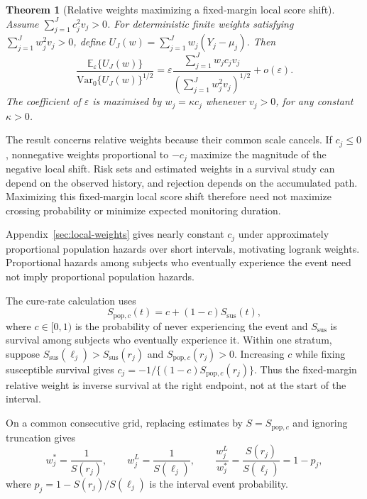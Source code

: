 \documentclass[12pt]{article}
\newtheorem{theorem}{Theorem}[section]
\theoremstyle{definition}
\theoremstyle{remark}
\begin{document}
\begin{theorem}[Relative weights maximizing a fixed-margin local score shift]
\label{thm:optimal-weight}
Assume $\sum_{j=1}^{J}c_j^2v_j>0$. For deterministic finite weights satisfying $\sum_{j=1}^Jw_j^2v_j>0$, define $U_J(w)=\sum_{j=1}^Jw_j(Y_j-\mu_j)$. Then
\begin{equation}
 \frac{\mathbb E_\varepsilon\{U_J(w)\}}{\mathrm{Var}_0\{U_J(w)\}^{1/2}}
 =\varepsilon\frac{\sum_{j=1}^Jw_jc_jv_j}{(\sum_{j=1}^Jw_j^2v_j)^{1/2}}
 +o(\varepsilon).
 \label{eq:main-local-efficacy}
\end{equation}
The coefficient of $\varepsilon$ is maximised by $w_j=\kappa c_j$ whenever $v_j>0$, for any constant $\kappa>0$.
\end{theorem}
The result concerns relative weights because their common scale cancels. If $c_j\leq0$, nonnegative weights proportional to $-c_j$ maximize the magnitude of the negative local shift. Risk sets and estimated weights in a survival study can depend on the observed history, and rejection depends on the accumulated path. Maximizing this fixed-margin local score shift therefore need not maximize crossing probability or minimize expected monitoring duration.

Appendix~\ref{sec:local-weights} gives nearly constant $c_j$ under approximately proportional population hazards over short intervals, motivating logrank weights. Proportional hazards among subjects who eventually experience the event need not imply proportional population hazards.

The cure-rate calculation uses
\begin{equation}
 S_{\mathrm{pop},c}(t)=c+(1-c)S_{\mathrm{sus}}(t),
 \label{eq:cure-survival}
\end{equation}
where $c\in[0,1)$ is the probability of never experiencing the event and $S_{\mathrm{sus}}$ is survival among subjects who eventually experience it. Within one stratum, suppose $S_{\mathrm{sus}}(\ell_j)>S_{\mathrm{sus}}(r_j)$ and $S_{\mathrm{pop},c}(r_j)>0$. Increasing $c$ while fixing susceptible survival gives $c_j=-1/\{(1-c)S_{\mathrm{pop},c}(r_j)\}$. Thus the fixed-margin relative weight is inverse survival at the right endpoint, not at the start of the interval.

On a common consecutive grid, replacing estimates by $S=S_{\mathrm{pop},c}$ and ignoring truncation gives
\begin{equation}
 w_j^*=\frac{1}{S(r_j)},\qquad w_j^L=\frac{1}{S(\ell_j)},\qquad
 \frac{w_j^L}{w_j^*}=\frac{S(r_j)}{S(\ell_j)}=1-p_j,
 \label{eq:gt-endpoint-ratio}
\end{equation}
where $p_j=1-S(r_j)/S(\ell_j)$ is the interval event probability.
\end{document}
